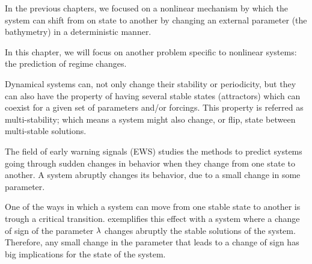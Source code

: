In the previous chapters, we focused on a nonlinear mechanism by which the system can shift from on state to another by changing an external parameter (the bathymetry) in a deterministic manner.



In this chapter, we will focus on another  problem specific to nonlinear systems: the prediction of regime  changes.

Dynamical systems can, not only change their stability or periodicity, but they can also have the property of having several stable states (attractors) which can coexist for a given set of parameters and/or forcings.
This property is referred as multi-stability; which means a system might also change, or flip, state between multi-stable solutions.

The field of early warning signals (EWS) studies the methods to predict systems going through sudden changes in behavior when they change from one state to another.
A system abruptly changes its behavior, due to a small change in some parameter. 

One of the ways in which a system can move from one stable state to another is trough a critical transition. 
 exemplifies this effect with a system where a change of sign of the parameter $\lambda$ changes abruptly the stable solutions of the system.  Therefore, any small change in the parameter that leads to a change of sign has big implications for the state of the system. 



